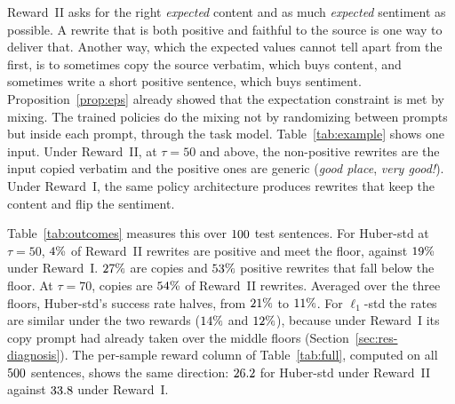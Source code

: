 \begin{table}[t]
\centering
\small

\caption{\textbf{What individual rewrites look like at the binding floors}
($\exAuditN$ test sentences, every fifth one, $50$ rewrites each; prompts
decoded as in each campaign's evaluation). \emph{Success}: positive (sentiment
$\ge 50$) \emph{and} at or above the floor. \emph{Drift}: positive but below the
floor. \emph{Copy}: not positive, with content $\ge 95$, i.e.\ the input
reproduced. The last column averages success over the three floors.}
\label{tab:outcomes}
\end{table}

Reward~II asks for the right \emph{expected} content and as much
\emph{expected} sentiment as possible. A rewrite that is both positive and
faithful to the source is one way to deliver that. Another way, which the
expected values cannot tell apart from the first, is to sometimes copy the
source verbatim, which buys content, and sometimes write a short positive
sentence, which buys sentiment. Proposition~\ref{prop:eps} already showed that
the expectation constraint is met by mixing. The trained policies do the mixing
not by randomizing between prompts but inside each prompt, through the task
model. Table~\ref{tab:example} shows one input. Under Reward~II, at $\tau = 50$
and above, the non-positive rewrites are the input copied verbatim and the
positive ones are generic (\emph{good place}, \emph{very good!}). Under
Reward~I, the same policy architecture produces rewrites that keep the content
and flip the sentiment.

Table~\ref{tab:outcomes} measures this over $\exAuditN$ test sentences. For
Huber-std at $\tau = 50$, $4\%$ of Reward~II rewrites are
positive and meet the floor, against $19\%$ under
Reward~I. $27\%$ are copies and $53\%$
positive rewrites that fall below the floor. At $\tau = 70$, copies are
$54\%$ of Reward~II rewrites. Averaged over the three floors,
Huber-std's success rate halves, from $21\%$ to
$11\%$. For $\ell_1$-std the rates are similar under the two
rewards ($14\%$ and $12\%$), because under
Reward~I its copy prompt had already taken over the middle floors
(Section~\ref{sec:res-diagnosis}). The per-sample reward column of
Table~\ref{tab:full}, computed on all $500$ sentences, shows the same
direction: $26.2$ for Huber-std under Reward~II against $33.8$
under Reward~I.

